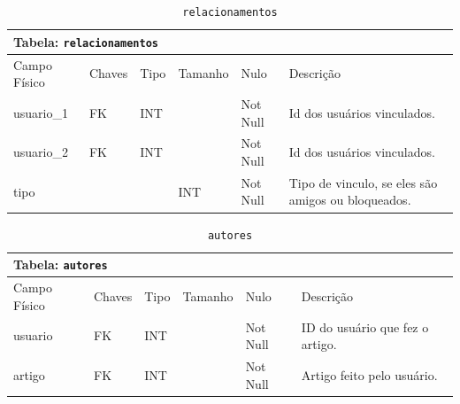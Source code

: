 \documentclass[12pt,a4paper]{article}
\begin{document}
\begin{center}
\begin{table}[h!]
	\caption{\texttt{relacionamentos}}
	\label{tabela:relacionamentos}
	\begin{tabular}{|p{2.5cm}|p{1cm}|p{1.25cm}|p{1.75cm}|p{1.25cm}|p{6cm}|}\hline	
		\multicolumn{6}{|p{16cm}|}{\cellcolor{cinzaClaro}  \centering Tabela: \texttt{relacionamentos}} \\ \hline %
		{\small Campo Físico}   & {\small Chaves} & {\small Tipo} & {\small Tamanho} & {\small Nulo} & {\small Descrição}\\\hline %
		
		{\tiny usuario\_1} & {\tiny FK} & {\tiny INT} & {\tiny } & {\tiny Not Null} &{\tiny Id dos usuários vinculados.}\\\hline
		{\tiny usuario\_2} & {\tiny FK} & {\tiny INT} & {\tiny } & {\tiny Not Null} &{\tiny Id dos usuários vinculados.}\\\hline
		{\tiny tipo} & {\tiny } & {\tiny } & {\tiny INT} & {\tiny Not Null} &{\tiny Tipo de vinculo, se eles são amigos ou bloqueados.}\\\hline
		
			
	\end{tabular}
\end{table}	
\end{center}

\begin{center}
\begin{table}[h!]
	\caption{\texttt{autores}}
	\label{tabela:autores}
	\begin{tabular}{|p{2.5cm}|p{1cm}|p{1.25cm}|p{1.75cm}|p{1.25cm}|p{5cm}|}\hline	
		\multicolumn{6}{|p{16cm}|}{\cellcolor{cinzaClaro}  \centering Tabela: \texttt{autores}} \\ \hline %
		{\small Campo Físico}   & {\small Chaves} & {\small Tipo} & {\small Tamanho} & {\small Nulo} & {\small Descrição}\\\hline %
		
		{\tiny usuario} & {\tiny FK} & {\tiny INT} & {\tiny } & {\tiny Not Null} &{\tiny ID do usuário que fez o artigo.}\\\hline
		{\tiny artigo} & {\tiny FK} & {\tiny INT} & {\tiny } & {\tiny Not Null} &{\tiny Artigo feito pelo usuário.}\\\hline
			
	\end{tabular}
\end{table}	
\end{center}
\end{document}
